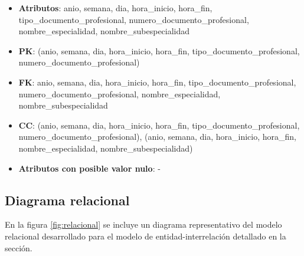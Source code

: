 \documentclass[a4paper,11pt]{article}
\begin{document}
\begin{itemize}

\item 
\textbf{Atributos}: anio, semana, dia, hora\_inicio, hora\_fin, tipo\_documento\_profesional, numero\_documento\_profesional, nombre\_especialidad, nombre\_subespecialidad

\item 
\textbf{PK}: (anio, semana, dia, hora\_inicio, hora\_fin, tipo\_documento\_profesional, numero\_documento\_profesional)

\item
\textbf{FK}: anio, semana, dia, hora\_inicio, hora\_fin, tipo\_documento\_profesional, numero\_documento\_profesional, nombre\_especialidad, nombre\_subespecialidad

\item 
\textbf{CC}: (anio, semana, dia, hora\_inicio, hora\_fin, tipo\_documento\_profesional, numero\_documento\_profesional),
(anio, semana, dia, hora\_inicio, hora\_fin, nombre\_especialidad, nombre\_subespecialidad)

\item 
\textbf{Atributos con posible valor nulo}: -

\end{itemize}

\newpage

\subsection{Diagrama relacional}

 En la figura \ref{fig:relacional} se incluye un diagrama representativo del
 modelo relacional desarrollado para el modelo de entidad-interrelación
 detallado en la sección.
\end{document}

